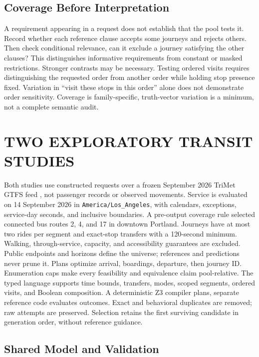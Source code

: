 \documentclass[a4paper,twoside]{article}
\begin{document}
\subsection{Coverage Before Interpretation}

A requirement appearing in a request does not establish that the pool tests it. Record whether each reference clause accepts some journeys and rejects others. Then check conditional relevance, can it exclude a journey satisfying the other clauses? This distinguishes informative requirements from constant or masked restrictions.
Stronger contrasts may be necessary. Testing ordered visits requires distinguishing the requested order from another order while holding stop presence fixed. Variation in ``visit these stops in this order'' alone does not demonstrate order sensitivity. Coverage is family-specific, truth-vector variation is a minimum, not a complete semantic audit.



\section{\uppercase{Two Exploratory Transit Studies}}
\label{sec:setup}

\noindent Both studies use constructed requests over a frozen September 2026 TriMet GTFS feed \cite{trimet,gtfs}, not passenger records or observed movements. Service is evaluated on 14 September 2026 in \texttt{America/Los\_Angeles}, with calendars, exceptions, service-day seconds, and inclusive boundaries.
A pre-output coverage rule selected connected bus routes 2, 4, and 17 in downtown Portland. Journeys have at most two rides per segment and exact-stop transfers with a 120-second minimum. Walking, through-service, capacity, and accessibility guarantees are excluded. Public endpoints and horizons define the universe; references and predictions never prune it. Plans optimize arrival, boardings, departure, then journey ID. Enumeration caps make every feasibility and equivalence claim pool-relative.
The typed language supports time bounds, transfers, modes, scoped segments, ordered visits, and Boolean composition. A deterministic Z3 compiler plans, separate reference code evaluates outcomes. Exact and behavioral duplicates are removed; raw attempts are preserved. Selection retains the first surviving candidate in generation order, without reference guidance.


\subsection{Shared Model and Validation}
\end{document}

